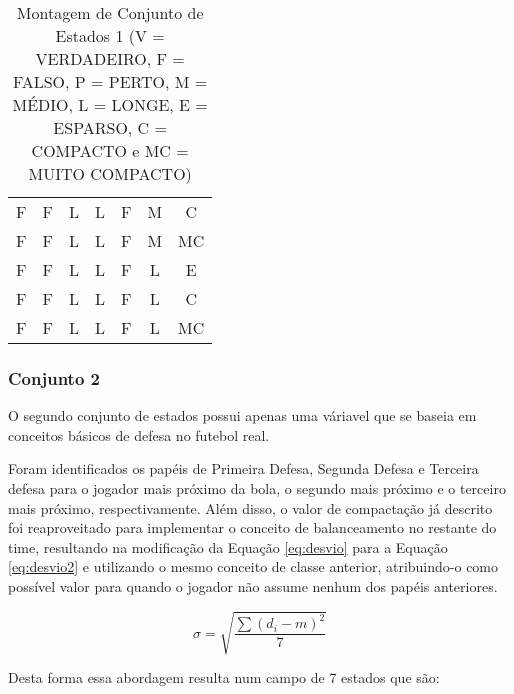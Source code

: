 \begin{table}[hbt]
\begin{tabular}{c|c|c|c|c|c|c}
        F       &   F       &   L       &   L       &   F       &   M       &   C \\
        F       &   F       &   L       &   L       &   F       &   M       &   MC \\
        F       &   F       &   L       &   L       &   F       &   L       &   E \\
        F       &   F       &   L       &   L       &   F       &   L       &   C \\
        F       &   F       &   L       &   L       &   F       &   L       &   MC \\
    \end{tabular}
    \caption{Montagem de Conjunto de Estados 1 (V = VERDADEIRO, F = FALSO, P = PERTO, M = MÉDIO, L = LONGE, E = ESPARSO, C = COMPACTO e MC = MUITO COMPACTO)}
    \label{tab:states1}
\end{table}

\subsubsection{Conjunto 2}

O segundo conjunto de estados possui apenas uma váriavel que se baseia em
conceitos básicos de defesa no futebol real.

Foram identificados os papéis de Primeira Defesa, Segunda Defesa e Terceira
defesa para o jogador mais próximo da bola, o segundo mais próximo e o terceiro
mais próximo, respectivamente. Além disso, o valor de compactação já descrito
foi reaproveitado para implementar o conceito de balanceamento no restante do
time, resultando na modificação da Equação \ref{eq:desvio} para a Equação
\ref{eq:desvio2} e utilizando o mesmo conceito de classe anterior, atribuindo-o
como possível valor para quando o jogador não assume nenhum dos papéis anteriores.

\begin{equation}
    \sigma=\sqrt{\frac{\sum{(d_i - m)^2}}{7}}
    \label{eq:desvio2}
\end{equation}

Desta forma essa abordagem resulta num campo de 7 estados que são:

